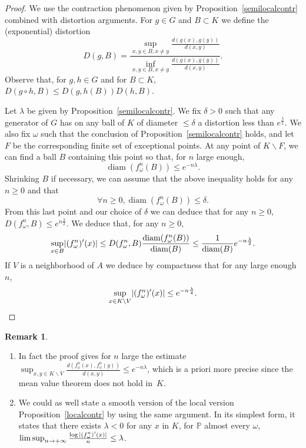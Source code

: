\documentclass[10pt]{amsart}
\theoremstyle{definition}\newtheorem{defi}[theo]{Definition}\newtheorem{rema}[theo]{Remark}\newtheorem{exam}[theo]{Example}\newtheorem{exem}[theo]{Example}\newtheorem{nota}[theo]{Notation}
\DeclareMathOperator{\diam}{diam}
\newcommand{\bbP}{\mathbb{P}}
\renewcommand*{\to}{\mathchoice{\longrightarrow}{\rightarrow}{\rightarrow}{\rightarrow}}
\let\originalleft\left
\let\originalright\right
\renewcommand{\left}{\mathopen{}\mathclose\bgroup\originalleft}
\renewcommand{\right}{\aftergroup\egroup\originalright}
\let\oldforall\forall
\renewcommand*{\forall}{\mathrel{\oldforall}}
\begin{document}
\begin{proof}
We use the contraction phenomenon given by Proposition~\ref{semilocalcontr} combined with distortion arguments. For $g\in G$ and $B\subset K$ we define the (exponential) distortion
\[
D(g,B)=\frac{\sup_{x,y \in B, x\neq y} \frac{d(g(x),g(y))}{d(x,y)}}{\inf_{x,y \in B, x\neq y} \frac{d(g(x),g(y))}{d(x,y)}}.
\]
Observe that, for $g,h \in G$ and for $B \subset K$, $D(g\circ h,B) \leq D(g,h(B))D(h,B)$.


Let $\lambda$ be given by Proposition~\ref{semilocalcontr}. We fix $\delta>0$ such that any generator of $G$ has on any ball of $K$ of diameter $\leq \delta$ a distortion less than $e^{\frac{\lambda}{2}}$. We also fix $\omega$ such that the conclusion of Proposition~\ref{semilocalcontr} holds, and let $F$ be the corresponding finite set of exceptional points. At any point of $K\backslash F$, we can find a ball $B$ containing this point so that, for $n$ large enough,
\[
\diam(f_\omega^n(B))\leq e^{-n\lambda}.
\]
Shrinking $B$ if necessary, we can assume that the above inequality holds for any $n \geq 0$ and that
\[
\forall n\geq 0, \diam(f_\omega^n(B))\leq \delta.
\]
From this last point and our choice of $\delta$ we can deduce that for any $n\geq 0$, ${D(f_\omega^n,B)\leq e^{n\frac{\lambda}{2}}}$. We deduce that, for any $n\geq 0$,
\[
\sup_{x\in B} \left|(f_\omega^n)'(x)\right|\leq D(f_\omega^n,B) \frac{\diam(f_\omega^n(B))}{\diam(B)}\leq \frac{1}{\diam(B)} e^{-n\frac{\lambda}{2}}.
\]
If $V$ is a neighborhood of $A$ we deduce by compactness that for any large enough $n$,
\[
\sup_{x\in K\backslash V} \left|(f_\omega^n)'(x)\right|\leq e^{-n\frac{\lambda}{4}}.\qedhere
\]
\end{proof}

\begin{rema}\leavevmode
\label{diffremark}
\begin{enumerate}
\item In fact the proof gives for $n$ large the estimate $\sup_{x,y\in K\backslash V} \frac{d(f_\omega^n(x),f_\omega^n(y))}{d(x,y)}\leq e^{-n\lambda}$, which is a priori more precise since the mean value theorem does not hold in~$K$.
\item We could as well state a smooth version of the local version Proposition~\ref{localcontr} by using the same argument. In its simplest form, it states that there exists $\lambda<0$ for any $x$ in $K$, for $\bbP$ almost every $\omega$, $\limsup_{n\to +\infty} \frac{\log |(f_\omega^n)'(x)|}{n}\leq \lambda$.
\end{enumerate}
\end{rema}
\end{document}
